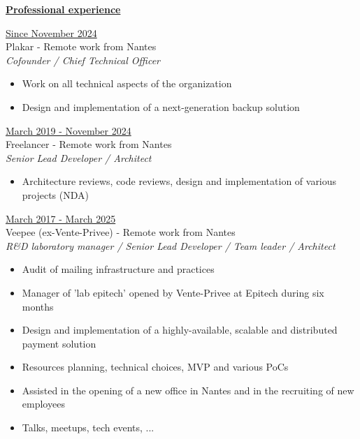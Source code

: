 \documentclass[a4paper,10pt]{letter}
\begin{document}
\underline{\textbf{Professional experience}}\\
\begin{description}
  \item{\underline{Since November 2024}}\\
  Plakar - Remote work from Nantes\\
  \textit{Cofounder / Chief Technical Officer}
  \begin{itemize}
    \item Work on all technical aspects of the organization
    \item Design and implementation of a next-generation backup solution\\
  \end{itemize}

\item{\underline{March 2019 - November 2024}}\\
  Freelancer - Remote work from Nantes\\
  \textit{Senior Lead Developer / Architect}
  \begin{itemize}
    \item Architecture reviews, code reviews, design and implementation of various projects (NDA)\\
  \end{itemize}

\item{\underline{March 2017 - March 2025}}\\
  Veepee (ex-Vente-Privee) - Remote work from Nantes\\
  \textit{R\&D laboratory manager / Senior Lead Developer / Team leader / Architect}
  \begin{itemize}
    \item Audit of mailing infrastructure and practices
    \item Manager of 'lab epitech' opened by Vente-Privee at Epitech during six months
    \item Design and implementation of a highly-available, scalable and distributed payment solution
    \item Resources planning, technical choices, MVP and various PoCs
    \item Assisted in the opening of a new office in Nantes and in the recruiting of new employees
    \item Talks, meetups, tech events, ...\\
  \end{itemize}


\end{description}
\end{document}
